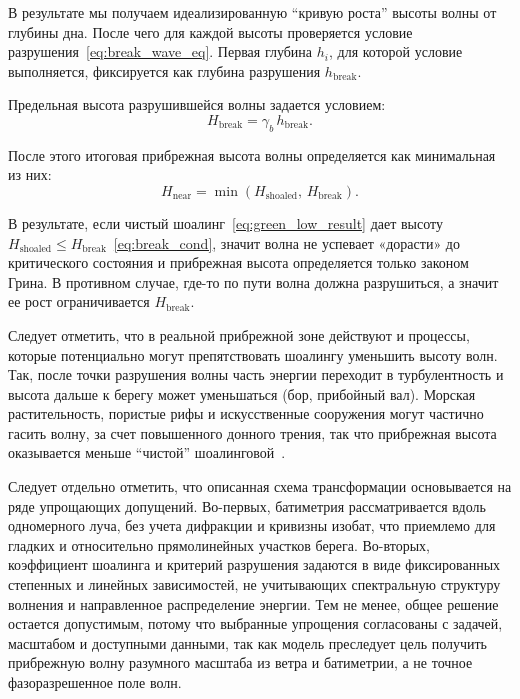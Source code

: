 В результате мы получаем идеализированную \enquote{кривую роста} высоты волны от глубины дна.
После чего для каждой высоты проверяется условие разрушения~\eqref{eq:break_wave_eq}.
Первая глубина $h_i$, для которой условие выполняется, фиксируется как глубина разрушения $h_{\text{break}}$.

Предельная высота разрушившейся волны задается условием:
\begin{equation}
    H_{\text{break}} = \gamma_b\,h_{\text{break}}.\label{eq:break_cond}
\end{equation}

После этого итоговая прибрежная высота волны определяется как минимальная из них:
\begin{equation}
    H_{\text{near}} = \min\!\left( H_{\text{shoaled}},\, H_{\text{break}} \right).
\end{equation}

В результате, если чистый шоалинг~\eqref{eq:green_low_result} дает высоту $H_{\text{shoaled}} \leq H_{\text{break}}$~\eqref{eq:break_cond}, значит волна не успевает «дорасти» до критического состояния и прибрежная высота определяется только законом Грина.
В противном случае, где-то по пути волна должна разрушиться, а значит ее рост ограничивается $H_{\text{break}}$.

Следует отметить, что в реальной прибрежной зоне действуют и процессы, которые потенциально могут препятствовать шоалингу уменьшить высоту волн.
Так, после точки разрушения волны часть энергии переходит в турбулентность и высота дальше к берегу может уменьшаться (бор, прибойный вал).
Морская растительность, пористые рифы и искусственные сооружения могут частично гасить волну, за счет повышенного донного трения, так что прибрежная высота оказывается меньше \enquote{чистой} шоалинговой~\cite{Magdalena2025waveShoalingPorous}.

Следует отдельно отметить, что описанная схема трансформации основывается на ряде упрощающих допущений.  
Во-первых, батиметрия рассматривается вдоль одномерного луча, без учета дифракции и кривизны изобат, что приемлемо для гладких и относительно прямолинейных участков берега. 
Во-вторых, коэффициент шоалинга и критерий разрушения задаются в виде фиксированных степенных и линейных зависимостей, не учитывающих спектральную структуру волнения и направленное распределение энергии. 
Тем не менее, общее решение остается допустимым, потому что выбранные упрощения согласованы с задачей, масштабом и доступными данными, так как модель преследует цель получить прибрежную волну разумного масштаба из ветра и батиметрии, а не точное фазоразрешенное поле волн.
